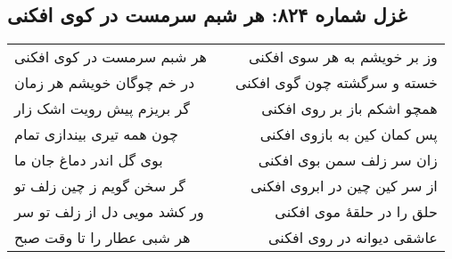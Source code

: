 \begin{center}
\section*{غزل شماره ۸۲۴: هر شبم سرمست در کوی افکنی}
\label{sec:824}
\begin{longtable}{l p{0.5cm} r}
هر شبم سرمست در کوی افکنی
&&
وز بر خویشم به هر سوی افکنی
\\
در خم چوگان خویشم هر زمان
&&
خسته و سرگشته چون گوی افکنی
\\
گر بریزم پیش رویت اشک زار
&&
همچو اشکم باز بر روی افکنی
\\
چون همه تیری بیندازی تمام
&&
پس کمان کین به بازوی افکنی
\\
بوی گل اندر دماغ جان ما
&&
زان سر زلف سمن بوی افکنی
\\
گر سخن گویم ز چین زلف تو
&&
از سر کین چین در ابروی افکنی
\\
ور کشد مویی دل از زلف تو سر
&&
حلق را در حلقهٔ موی افکنی
\\
هر شبی عطار را تا وقت صبح
&&
عاشقی دیوانه در روی افکنی
\\
\end{longtable}
\end{center}
